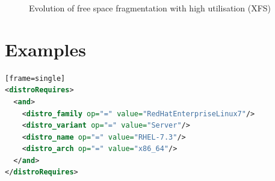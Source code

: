 \documentclass[
  color, %
  table, %
  lof,   %
  lot,   %
]{fithesis3}
\begin{document}
\begin{figure}[htb]
    \centering
    \caption{Evolution of free space fragmentation with high utilisation (XFS)}
    \label{fig:free99}
\end{figure}




\chapter{Examples}
\label{examples}


\begin{lstlisting}[language=xml, caption={Specifying OS to be installed}][frame=single]
<distroRequires>
  <and>
    <distro_family op="=" value="RedHatEnterpriseLinux7"/>
    <distro_variant op="=" value="Server"/>
    <distro_name op="=" value="RHEL-7.3"/>
    <distro_arch op="=" value="x86_64"/>
  </and>
</distroRequires>
\end{lstlisting}
\end{document}
